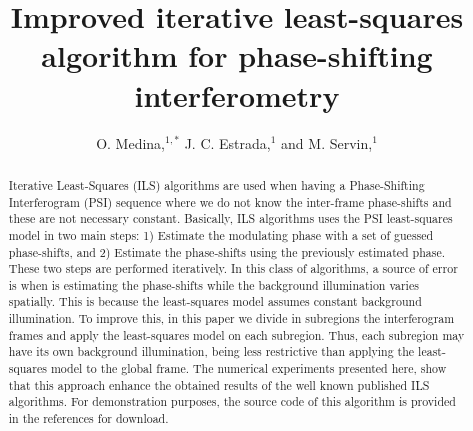 \documentclass[letterpaper,12pt]{article}   %
\begin{document}
\title{Improved iterative least-squares algorithm for phase-shifting
  interferometry}

\author{O. Medina,$^{1,*}$ J. C. Estrada,$^{1}$ and M. Servin,$^{1}$}

\address{$^1$Centro de Investigaciones en Optica A. C., Loma del
  bosque 115, Col. Lomas del Campestre, Leon Guanajuato, 37150,
  Mexico}

\address{$^*$Corresponding author: orlandomedina@cio.mx}

\maketitle

\begin{abstract}
  Iterative Least-Squares (ILS) algorithms are used when having a
  Phase-Shifting Interferogram (PSI) sequence where we do not know the
  inter-frame phase-shifts and these are not necessary
  constant. Basically, ILS algorithms uses the PSI least-squares model
  in two main steps: 1) Estimate the modulating phase with a set of
  guessed phase-shifts, and 2) Estimate the phase-shifts using the
  previously estimated phase. These two steps are performed
  iteratively. In this class of algorithms, a source of error is when
  is estimating the phase-shifts while the background illumination
  varies spatially. This is because the least-squares model assumes
  constant background illumination. To improve this, in this paper we
  divide in subregions the interferogram frames and apply the
  least-squares model on each subregion. Thus, each subregion may have
  its own background illumination, being less restrictive than
  applying the least-squares model to the global frame. The numerical
  experiments presented here, show that this approach enhance the
  obtained results of the well known published ILS algorithms. For
  demonstration purposes, the source code of this algorithm is
  provided in the references for download.
\end{abstract}
\end{document}
